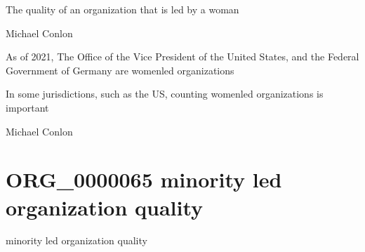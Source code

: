 \documentclass[letterpaper,10pt,english]{sphinxmanual}
\begin{document}
\begin{sphinxShadowBox}

\sphinxAtStartPar
The quality of an organization that is led by a woman
\end{sphinxShadowBox}

\begin{sphinxShadowBox}

\sphinxAtStartPar
Michael Conlon 
\end{sphinxShadowBox}

\begin{sphinxShadowBox}

\sphinxAtStartPar
As of 2021, The Office of the Vice President of the United States, and the Federal Government of Germany are women\sphinxhyphen{}led organizations
\end{sphinxShadowBox}

\begin{sphinxShadowBox}

\sphinxAtStartPar
In some jurisdictions, such as the US, counting women\sphinxhyphen{}led organizations is important
\end{sphinxShadowBox}

\begin{sphinxShadowBox}

\sphinxAtStartPar
Michael Conlon 
\end{sphinxShadowBox}
\begin{quote}
\label{\detokenize{doc-ORG_0000065:org-0000065}}\label{\detokenize{doc-ORG_0000065:minority-led-organization-quality}}\label{\detokenize{doc-ORG_0000065:org-0000065}}
\ignorespaces \end{quote}


\section{ORG\_0000065 \sphinxhyphen{} minority led organization quality}
\label{\detokenize{doc-ORG_0000065:org-0000065-minority-led-organization-quality}}\label{\detokenize{doc-ORG_0000065:index-0}}\label{\detokenize{doc-ORG_0000065::doc}}
\begin{sphinxShadowBox}

\sphinxAtStartPar
minority led organization quality
\end{sphinxShadowBox}
\end{document}
